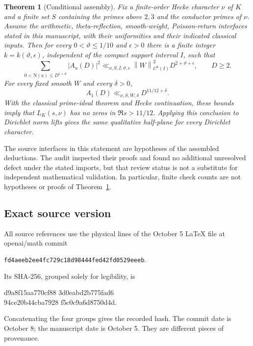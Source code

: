 \documentclass[11pt]{article}
\numberwithin{equation}{section}
\newtheorem{theorem}{Theorem}[section]
\theoremstyle{definition}
\theoremstyle{remark}
\newcommand{\N}{\mathrm N}
\newcommand{\norm}[1]{\left\|#1\right\|}
\begin{document}
\begin{theorem}[Conditional assembly]\label{thm:assembly}
Fix a finite-order Hecke character \(\nu\) of \(K\) and a finite set
\(S\) containing the primes above \(2,3\) and the conductor primes of
\(\nu\). Assume the arithmetic, theta-reflection, smooth-weight,
Poisson-return interfaces stated in this
manuscript, with their uniformities and their indicated classical
inputs. Then for every \(0<\vartheta\le1/10\) and \(\epsilon>0\)
there is a finite integer \(k=k(\vartheta,\epsilon)\), independent
of the compact support interval \(I\), such that
\begin{equation}\label{eq:main-moment}
 \sum_{0<\N(u)\le D^{1+\vartheta}}|A_u(D)|^2
 \ll_{\nu,S,I,\vartheta,\epsilon}
 \norm{W}_{C^k(I)}^2D^{2+\vartheta+\epsilon},
 \qquad D\ge2.
\end{equation}
For every fixed smooth \(W\) and every \(\delta>0\),
\begin{equation}\label{eq:fixed-saving}
 A_1(D)\ll_{\nu,S,W,\delta}D^{11/12+\delta}.
\end{equation}
With the classical prime-ideal theorem and Hecke continuation, these
bounds imply that \(L_K(s,\nu)\) has no zeros in \(\Re s>11/12\).
Applying this conclusion to Dirichlet norm lifts gives the same
qualitative half-plane for every Dirichlet character.
\end{theorem}

The source interfaces in this statement are hypotheses of the
assembled deductions. The audit inspected their proofs and found no
additional unresolved defect under the stated imports, but that review
status is not a substitute for independent mathematical validation.
In particular, finite check counts are not hypotheses or proofs of
Theorem~\ref{thm:assembly}.

\subsection{Exact source version}

All source references use the physical lines of the October 5
LaTeX file at openai/math commit
\begin{center}
\texttt{fd4aeeb2ee4fc729c18d98444fed42fd0529eeeb}.
\end{center}
Its SHA-256, grouped solely for legibility, is
\begin{center}\small\ttfamily
d9a8f15aa770cf88 3d0eabd2b775fad6\\
94ce20b44cba7928 f5c0c9a6d8750d4d.
\end{center}
Concatenating the four groups gives the recorded hash. The commit
date is October 8; the manuscript date is October 5. They are
different pieces of provenance.
\end{document}

